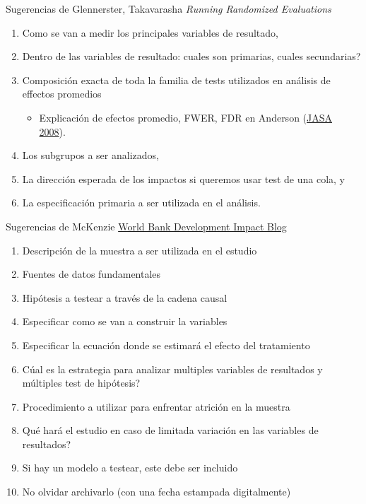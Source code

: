 \documentclass{beamer}
\begin{document}
\begin{frame}{Sugerencias de Glennerster, Takavarasha}
\textit{Running Randomized Evaluations}
\begin{enumerate}[<.->]
\def\labelenumi{\arabic{enumi}.}
\item
  Como se van a medir los principales variables de resultado, 
\item
 Dentro de las variables de resultado: cuales son primarias, cuales secundarias?
\item
Composición exacta de toda la familia de tests utilizados en análisis de effectos promedios
  \begin{itemize}
  \item Explicación de efectos promedio, FWER, FDR en Anderson (\href{https://are.berkeley.edu/~mlanderson/pdf/Anderson\%202008a.pdf}{JASA 2008}).
  \end{itemize}
\item
  Los subgrupos a ser analizados,
\item
La dirección esperada de los impactos si queremos usar test de una cola, y

\item
 La especificación primaria a ser utilizada en el análisis.
\end{enumerate}
\end{frame}

\begin{frame}{Sugerencias de McKenzie}
\href{http://blogs.worldbank.org/impactevaluations/a-pre-analysis-plan-checklist}{World Bank Development Impact Blog}

\begin{enumerate}[<.->]
\item
Descripción de la muestra a ser utilizada en el estudio
\item
 Fuentes de datos fundamentales
\item
Hipótesis a testear a través de la cadena causal
\item
Especificar como se van a construir la variables
\item
Especificar la ecuación donde se estimará el efecto del tratamiento 
\item
Cúal es la estrategia para analizar multiples variables de resultados y múltiples test de hipótesis?
\item
Procedimiento a utilizar para enfrentar atrición en la muestra
\item
Qué hará el estudio en caso de limitada variación en las variables de resultados?
\item
Si hay un modelo a testear, este debe ser incluido
\item
No olvidar archivarlo (con una fecha estampada digitalmente)
\end{enumerate}
\end{frame}
\end{document}
